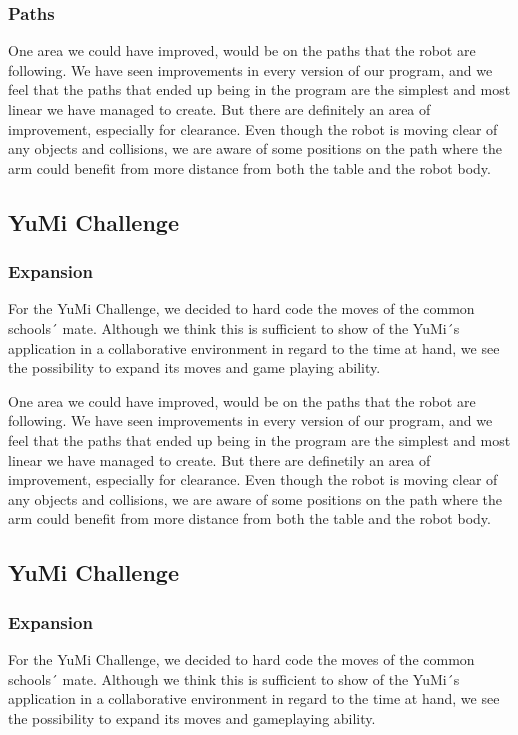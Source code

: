 \documentclass[a4paper,12pt]{article}
\begin{document}
\subsubsection{Paths}

One area we could have improved, would be on the paths that the robot are following. We have seen improvements in every version of our program, and we feel that the paths that ended up being in the program are the simplest and most linear we have managed to create. But there are definitely an area of improvement, especially for clearance. Even though the robot is moving clear of any objects and collisions, we are aware of some positions on the path where the arm could benefit from more distance from both the table and the robot body.

\subsection{YuMi Challenge}
\subsubsection{Expansion}
For the YuMi Challenge, we decided to hard code the moves of the common schools´ mate. Although we think this is sufficient to show of the YuMi´s application in a collaborative environment in regard to the time at hand, we see the possibility to expand its moves and game playing ability. 

One area we could have improved, would be on the paths that the robot are following. We have seen improvements in every version of our program, and we feel that the paths that ended up being in the program are the simplest and most linear we have managed to create. But there are definetily an area of improvement, especially for clearance. Even though the robot is moving clear of any objects and collisions, we are aware of some positions on the path where the arm could benefit from more distance from both the table and the robot body.

\subsection{YuMi Challenge}
\subsubsection{Expansion}
For the YuMi Challenge, we decided to hard code the moves of the common schools´ mate. Although we think this is sufficient to show of the YuMi´s application in a collaborative environment in regard to the time at hand, we see the possibility to expand its moves and gameplaying ability. 
\end{document}
